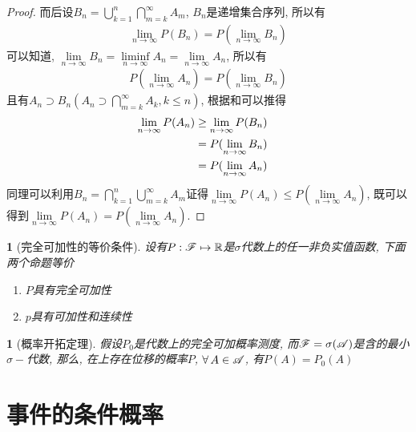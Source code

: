 \begin{enumerate}
\begin{proof}
        而后设\(B_n = \bigcup\limits_{k=1}^n\bigcap\limits_{m=k}^\infty A_m\), \(B_n\)是递增集合序列, 所以有
        \begin{align}\label{equ:seqcon1}\lim\limits_{n\to\infty}P(B_n) = P(\lim\limits_{n\to\infty}B_n)\end{align}
        可以知道, \(\lim\limits_{n\to\infty}B_n = \liminf\limits_{n\to\infty}A_n = \lim\limits_{n\to\infty}A_n\),
        所以有\begin{align}\label{equ:seqcon2}P(\lim\limits_{n\to\infty}A_n) = P(\lim\limits_{n\to\infty}B_n)\end{align}
        且有\(A_n \supset B_n(A_n\supset\bigcap\limits_{m=k}^\infty A_k, k\le n)\), 根据和可以推得
        \begin{align}\label{equ:seqcon3}
            \lim\limits_{n\to\infty}P(A_n)&\ge \lim\limits_{n\to\infty}P(B_n)\cr
            &= P(\lim\limits_{n\to\infty}B_n)\cr &= P(\lim\limits_{n\to\infty}A_n)
        \end{align}
        同理可以利用\(B_n = \bigcap\limits_{k=1}^n\bigcup\limits_{m=k}^\infty A_m\)证得\(\lim\limits_{n\to\infty}P(A_n)\le P(\lim\limits_{n\to\infty}A_n)\),
        既可以得到\(\lim\limits_{n\to\infty}P(A_n) = P(\lim\limits_{n\to\infty}A_n)\).
    \end{proof}
\end{enumerate}

\newtheorem{continuous_eqaulity__}[theorem_root]{\theorem}
\begin{continuous_eqaulity__}[完全可加性的等价条件]
设有\(P:\msF\mapsto\Rs\)是\(\sigma\)代数\msF 上的任一非负实值函数, 下面两个命题等价
\begin{enumerate}
\item \(P\)具有完全可加性
\item \(p\)具有可加性和连续性
\end{enumerate}
\end{continuous_eqaulity__}

\newtheorem{probability_exploring_theorem}[theorem_root]{\theorem}
\begin{probability_exploring_theorem}[概率开拓定理]
    假设\(P_0\)是代数\msA 上的完全可加概率测度, 而\(\msF = \sigma(\msA)\)是含\msA 的最小\(\sigma-\)代数, 
    那么, 在\msF 上存在位移的概率\(P\), \(\forall\,A\in\msA\), 有\(P(A) = P_0(A)\)
\end{probability_exploring_theorem}

\section{事件的条件概率}

